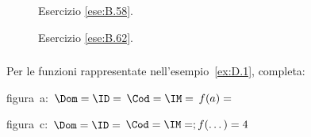 \begin{inaccessibleblock}
 \begin{figure}[h]
 \centering
 
 \caption{Esercizio \ref{ese:B.58}.}\label{fig:B.22}
\end{figure}
\end{inaccessibleblock}

\begin{inaccessibleblock}
 \begin{figure}[h]
 \centering
 
 \caption{Esercizio \ref{ese:B.62}.}\label{fig:B.23}
\end{figure}
\end{inaccessibleblock}

%  
%  


\subsubsection*{}

\begin{esercizio}
 \label{ese:D.1}
 Per le funzioni rappresentate nell'esempio~\ref{ex:D.1}, completa:

 \begin{itemize*}
\item figura~a:~$\Dom =\ID = \dotfill$ $\Cod = \IM = \dotfill$ $f(a) = \dotfill$
\item figura~c:~$\Dom = \ID = \dotfill$ $\Cod = \IM = \dotfill; f(\dots)= 4$
\end{itemize*}
 \end{esercizio}

